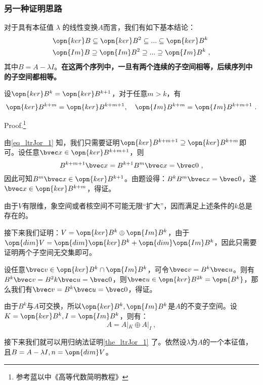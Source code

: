 \subsubsection{另一种证明思路}
对于具有本征值 $\lambda$ 的线性变换$A$而言，我们有如下基本结论：
\begin{equation}\label{eq_ltrJor_1}
\begin{aligned}
&\opn{ker}B\subseteq\opn{ker}B^2\subseteq...\subseteq\opn{ker}B^k\\
&\opn{Im}B\supseteq\opn{Im}B^2\supseteq...\supseteq\opn{Im}B^k~,
\end{aligned}
\end{equation}
其中$B=A-\lambda I$。\textbf{在这两个序列中，一旦有两个连续的子空间相等，后续序列中的子空间都相等。}
\begin{lemma}{}
设$\opn{ker}B^k=\opn{ker}B^{k+1}$，对于任意$m>k$，有\begin{equation}
\opn{ker}B^{k+m}=\opn{ker}B^{k+m+1},\quad\opn{Im}B^{k+m}=\opn{Im}B^{k+m+1}~.
\end{equation}
\end{lemma}
Proof.\footnote{参考蓝以中《高等代数简明教程》}

由\autoref{eq_ltrJor_1} 知，我们只需要证明$\opn{ker}B^{k+m+1}\supseteq \opn{ker}B^{k+m}$即可。设任意$\bvec x\in \opn{ker}B^{k+m+1}$，则
\begin{equation}
B^{k+m+1}\bvec x=B^{k+1}B^m\bvec x=\bvec 0~,
\end{equation}
因此可知$B^m\bvec x\in\opn{ker}B^{k+1}$。由题设得：$B^{k}B^m\bvec x=\bvec 0$，遂$\bvec x\in\opn{ker}B^{k+m}$，得证。

由于$V$有限维，象空间或者核空间不可能无限“扩大”，因而满足上述条件的$k$总是存在的。

接下来我们证明：$V=\opn{ker}B^k\oplus\opn{Im}B^k$，由于$\opn{dim}V=\opn{dim}\opn{ker}B^k+\opn{dim}\opn{Im}B^k$，因此只需要证明两个子空间无交集即可。

设任意$\bvec v\in \opn{ker}B^k\cap\opn{Im}B^k$，可令$\bvec v=B^k\bvec u$。则有$B^k\bvec v=B^2k\bvec u=\bvec 0$，则$\bvec u\in \opn{ker}B^{2k}=\opn{B^k}$，那么我们有$\bvec v=B^k\bvec u=\bvec 0$，得证。

由于$B^k$与$A$可交换，所以$\opn{ker}B^k,\opn{Im}B^k$是$A$的不变子空间。设$K=\opn{ker}B^k,I=\opn{Im}B^k$，则有：
\begin{equation}
A=A|_K\oplus A|_I~,
\end{equation}

接下来我们就可以用归纳法证明\autoref{the_ltrJor_1} 了。依然设$\lambda$为$A$的一个本征值，且$B=A-\lambda I,n=\opn{dim}V$。

